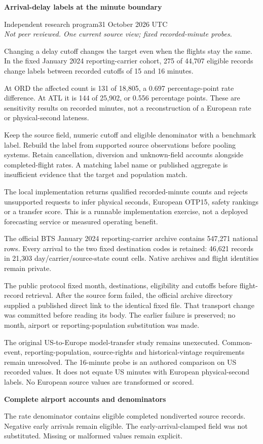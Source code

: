 \documentclass[11pt,letterpaper]{article}
\newcommand{\heading}[1]{\vspace{4pt}{\large\bfseries #1}\par}
\newcommand{\BoundA}{275}
\newcommand{\BoundB}{44,707}
\newcommand{\BoundC}{131}
\newcommand{\BoundD}{18,805}
\newcommand{\BoundE}{0.697}
\newcommand{\BoundF}{144}
\newcommand{\BoundG}{25,902}
\newcommand{\BoundH}{0.556}
\newcommand{\BoundI}{547,271}
\newcommand{\BoundJ}{46,621}
\newcommand{\BoundK}{21,303}
\begin{document}
{\LARGE\bfseries Arrival-delay labels at the minute boundary\par}
\vspace{5pt}
Independent research program\hfill 31 October 2026 UTC\\
\textit{Not peer reviewed. One current source view; fixed recorded-minute probes.}

\heading{Practical finding}
Changing a delay cutoff changes the target even when the flights stay the same. In the fixed January 2024 reporting-carrier cohort, \BoundA{} of \BoundB{} eligible records change labels between recorded cutoffs of 15 and 16 minutes.

At ORD the affected count is \BoundC{} of \BoundD{}, a \BoundE{} percentage-point rate difference. At ATL it is \BoundF{} of \BoundG{}, or \BoundH{} percentage points. These are sensitivity results on recorded minutes, not a reconstruction of a European rate or physical-second lateness.

\heading{Recommended use}
Keep the source field, numeric cutoff and eligible denominator with a benchmark label. Rebuild the label from supported source observations before pooling systems. Retain cancellation, diversion and unknown-field accounts alongside completed-flight rates. A matching label name or published aggregate is insufficient evidence that the target and population match.

The local implementation returns qualified recorded-minute counts and rejects unsupported requests to infer physical seconds, European OTP15, safety rankings or a transfer score. This is a runnable implementation exercise, not a deployed forecasting service or measured operating benefit.

\heading{Source and fixed scope}
The official BTS January 2024 reporting-carrier archive contains \BoundI{} national rows. Every arrival to the two fixed destination codes is retained: \BoundJ{} records in \BoundK{} day/carrier/source-state count cells. Native archives and flight identities remain private.

The public protocol fixed month, destinations, eligibility and cutoffs before flight-record retrieval. After the source form failed, the official archive directory supplied a published direct link to the identical fixed file. That transport change was committed before reading its body. The earlier failure is preserved; no month, airport or reporting-population substitution was made.

\heading{Original transfer question remains unexecuted}
The original US-to-Europe model-transfer study remains unexecuted. Common-event, reporting-population, source-rights and historical-vintage requirements remain unresolved. The 16-minute probe is an authored comparison on US recorded values. It does not equate US minutes with European physical-second labels. No European source values are transformed or scored.
\newpage
{\Large\bfseries Complete airport accounts and denominators\par}
The rate denominator contains eligible completed nondiverted source records. Negative early arrivals remain eligible. The early-arrival-clamped field was not substituted. Missing or malformed values remain explicit.
\end{document}

